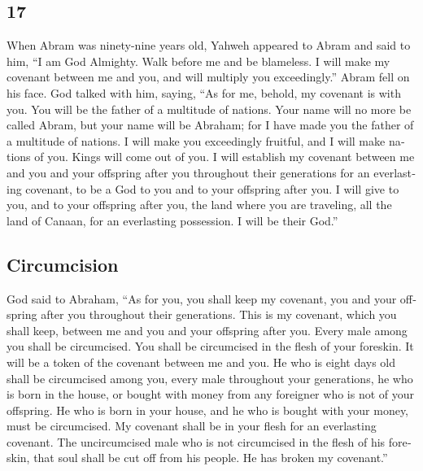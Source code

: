 \begin{paracol}{2}
\begin{otherlanguage}{english}
\hypertarget{section-33}{%
\section{17}\label{section-33}}

 When Abram was ninety-nine years old, Yahweh appeared to
Abram and said to him, ``I am God Almighty. Walk before me and be
blameless.  I will make my covenant between me and you,
and will multiply you exceedingly.''  Abram fell on his
face. God talked with him, saying,  ``As for me, behold,
my covenant is with you. You will be the father of a multitude of
nations.  Your name will no more be called Abram, but your
name will be Abraham; for I have made you the father of a multitude of
nations.  I will make you exceedingly fruitful, and I will
make nations of you. Kings will come out of you.  I will
establish my covenant between me and you and your offspring after you
throughout their generations for an everlasting covenant, to be a God to
you and to your offspring after you.  I will give to you,
and to your offspring after you, the land where you are traveling, all
the land of Canaan, for an everlasting possession. I will be their
God.''

\hypertarget{circumcision}{%
\subsection{Circumcision}\label{circumcision}}

 God said to Abraham, ``As for you, you shall keep my
covenant, you and your offspring after you throughout their generations.
 This is my covenant, which you shall keep, between me
and you and your offspring after you. Every male among you shall be
circumcised.  You shall be circumcised in the flesh of
your foreskin. It will be a token of the covenant between me and you.
 He who is eight days old shall be circumcised among you,
every male throughout your generations, he who is born in the house, or
bought with money from any foreigner who is not of your offspring.
 He who is born in your house, and he who is bought with
your money, must be circumcised. My covenant shall be in your flesh for
an everlasting covenant.  The uncircumcised male who is
not circumcised in the flesh of his foreskin, that soul shall be cut off
from his people. He has broken my covenant.''


\end{otherlanguage}
\end{paracol}
